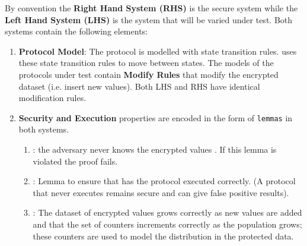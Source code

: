 \documentclass[runningheads]{llncs}
\begin{document}
 By convention the \textbf{Right Hand System (RHS)} is the secure system while the \textbf{Left Hand System (LHS)} is the system that will be varied under test. Both systems contain the following elements:
\begin{enumerate}[label=(\Alph*)]
\item \textbf{Protocol Model}: The protocol is modelled with \tamarin{} state transition rules. \tamarin{} uses these state transition rules to move between states. The models of the protocols under test contain \textbf{Modify Rules} that modify the encrypted dataset (i.e. insert new values). Both LHS and RHS have identical modification rules.
\item \textbf{Security and Execution} properties are encoded in the form of \texttt{lemmas} in both systems. 
\begin{enumerate}
	\item {}: the adversary never knows the encrypted values \enc{}. If this lemma is violated the proof fails.
    \item {}: Lemma to ensure that has the protocol executed correctly. (A protocol that never executes remains secure and can give false positive results).
	\item {}: The dataset of encrypted values \enc{} grows correctly as new values are added and that the set of counters increments correctly as the population grows; these counters are used to model the distribution in the protected data.
\end{enumerate}


\end{enumerate}
\end{document}
